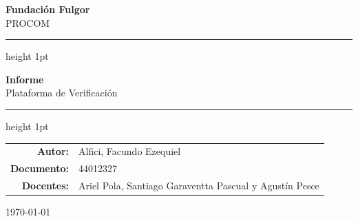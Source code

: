 \documentclass[12pt, a4paper]{article}
\newcommand{\tema}{Plataforma de Verificación}
\newcommand{\titulotrabajo}{Informe}
\newcommand{\autor}{Alfici, Facundo Ezequiel}
\newcommand{\documento}{44012327}
\newcommand{\curso}{PROCOM}
\newcommand{\fundacion}{Fundación Fulgor}
\newcommand{\fecha}{\today}
\begin{document}
\thispagestyle{empty}

\begin{center}   %

    {\Large \textbf{\fundacion}}\\[0.3cm]      %
    {\large \curso}

    \vspace{1.5cm}   %


    \hrule height 1pt   %
    \vspace{0.4cm}

    {\LARGE \textbf{\titulotrabajo}}\\[0.3cm]
    {\large \tema}

    \vspace{0.4cm}
    \hrule height 1pt

    \vspace{2.5cm}

    \begin{tabular}{r l}   %
        \textbf{Autor:}   & \autor\\[0.2cm]
        \textbf{Documento:}  & \documento\\[0.2cm]
        \textbf{Docentes:} &  Ariel Pola, Santiago Garaventta Pascual y Agustín Pesce\\
    \end{tabular}

    \vspace{3cm}

    {\large \fecha}

\end{center}

\newpage

\tableofcontents   %
\newpage
\end{document}
